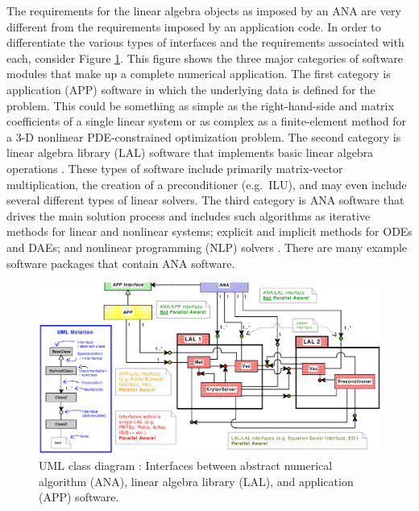 The requirements for the linear algebra objects as imposed by an ANA
are very different from the requirements imposed by an application
code.  In order to differentiate the various types of interfaces and
the requirements associated with each, consider Figure
\ref{tsfcore:fig:ANA_LAL_APP}.  This figure shows the three major
categories of software modules that make up a complete numerical
application.  The first category is application (APP) software in
which the underlying data is defined for the problem.  This could be
something as simple as the right-hand-side and matrix coefficients of
a single linear system or as complex as a finite-element method for a
3-D nonlinear PDE-constrained optimization problem.  The second
category is linear algebra library (LAL) software that implements
basic linear algebra operations \cite{ref:demmel_1997,
ref:anderson_1995, ref:blackford_et_al_1997, ref:aztec, ref:petsc,
ref:trilinos}. These types of software include primarily matrix-vector
multiplication, the creation of a preconditioner (e.g.~ILU), and may
even include several different types of linear solvers.  The third
category is ANA software that drives the main solution process and
includes such algorithms as iterative methods for linear and nonlinear
systems; explicit and implicit methods for ODEs and DAEs; and
nonlinear programming (NLP) solvers \cite{ref:nocedal_wright_1999}.
There are many example software packages
\cite{ref:petsc,ref:aztec,ref:trilinos,ref:pvode,ref:tao} that contain
ANA software.

{\bsinglespace
\begin{figure}[t]
\begin{center}
\includegraphics*[bb= 0.245in 2.95in 10.85in 8.60in,angle=0,scale=0.50
]{analal}
\end{center}
\caption{
\label{tsfcore:fig:ANA_LAL_APP}
UML \cite{ref:booch_et_al_1999} class diagram : Interfaces between abstract numerical algorithm
(ANA), linear algebra library (LAL), and application (APP) software.
}
\end{figure}
\esinglespace}

